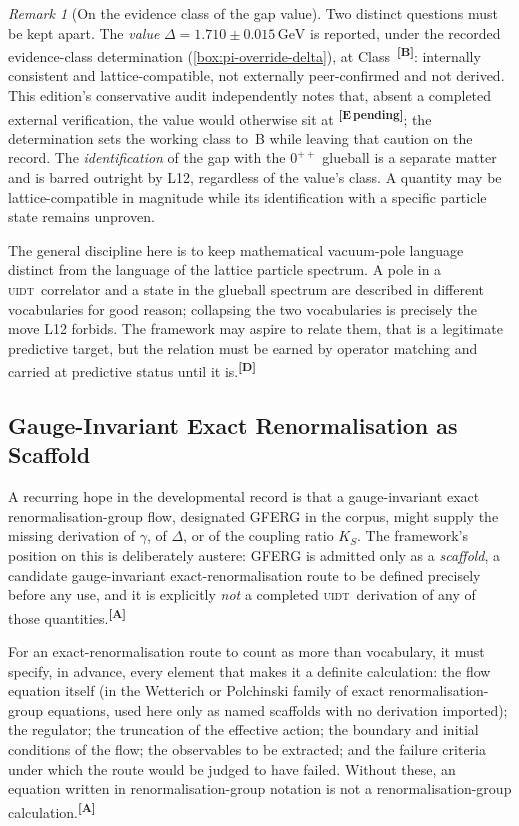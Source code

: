 \documentclass[12pt,a4paper,twoside]{article}
\theoremstyle{plain}
\theoremstyle{definition}
\theoremstyle{remark}
\newtheorem{remark}[theorem]{Remark}
\newcommand{\UIDT}{\textsc{uidt}}
\newcommand{\GeV}{\,\mathrm{GeV}}
\newcommand{\catmark}[1]{\textsuperscript{\textsf{\textbf{[#1]}}}}
\newcommand{\DeltaGap}{1.710 \pm 0.015\GeV} %
\begin{document}
\begin{remark}[On the evidence class of the gap value]
Two distinct questions must be kept apart. The \emph{value} $\Delta = \DeltaGap$ is reported, under the recorded evidence-class determination (\cref{box:pi-override-delta}), at Class~\catmark{B}: internally consistent and lattice-compatible, not externally peer-confirmed and not derived. This edition's conservative audit independently notes that, absent a completed external verification, the value would otherwise sit at \catmark{E\,pending}; the determination sets the working class to~B while leaving that caution on the record. The \emph{identification} of the gap with the $0^{++}$ glueball is a separate matter and is barred outright by L12, regardless of the value's class. A quantity may be lattice-compatible in magnitude while its identification with a specific particle state remains unproven.
\end{remark}

\noindent The general discipline here is to keep mathematical vacuum-pole language distinct from the language of the lattice particle spectrum. A pole in a \UIDT\ correlator and a state in the glueball spectrum are described in different vocabularies for good reason; collapsing the two vocabularies is precisely the move L12 forbids. The framework may aspire to relate them, that is a legitimate predictive target, but the relation must be earned by operator matching and carried at predictive status until it is.\catmark{D}

\subsection{Gauge-Invariant Exact Renormalisation as Scaffold}
\label{subsec:gferg-scaffold}

A recurring hope in the developmental record is that a gauge-invariant exact renormalisation-group flow, designated GFERG in the corpus, might supply the missing derivation of $\gamma$, of $\Delta$, or of the coupling ratio $K_S$. The framework's position on this is deliberately austere: GFERG is admitted only as a \emph{scaffold}, a candidate gauge-invariant exact-renormalisation route to be defined precisely before any use, and it is explicitly \emph{not} a completed \UIDT\ derivation of any of those quantities.\catmark{A}

For an exact-renormalisation route to count as more than vocabulary, it must specify, in advance, every element that makes it a definite calculation: the flow equation itself (in the Wetterich or Polchinski family of exact renormalisation-group equations, used here only as named scaffolds with no derivation imported); the regulator; the truncation of the effective action; the boundary and initial conditions of the flow; the observables to be extracted; and the failure criteria under which the route would be judged to have failed. Without these, an equation written in renormalisation-group notation is not a renormalisation-group calculation.\catmark{A}
\end{document}
